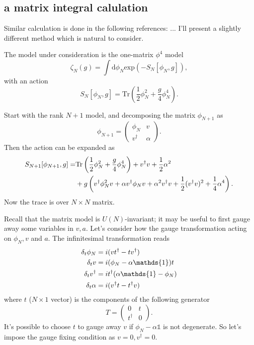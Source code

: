 \subsection{a matrix integral calulation}
Similar calculation is done in the following references: ...
I'll present a slightly different method which is natural to consider.


The model under consideration is the one-matrix $\phi^4$ model
\begin{equation}
    \zeta_N(g) = \int \mathrm{d}\phi_N \mathrm{exp}(-S_N[\phi_N,g]),
\end{equation}
with an action
\begin{equation}
    S_N[\phi_N,g] = \mathrm{Tr} (\frac{1}{2}\phi_N^2 + \frac{g}{4}\phi_N^4).
\end{equation}

Start with the rank $N+1$ model, and decomposing the matrix $\phi_{N+1}$ as
\begin{equation}
    \phi_{N+1} = \begin{pmatrix}
\phi_N & v\\ 
 v^\dagger & \alpha
\end{pmatrix}.
\end{equation}
Then the action can be expanded as
\begin{align}
	S_{N+1}[\phi_{N+1},g] = &\mathrm{Tr}\left( \frac{1}{2}\phi_N^2+\frac{g}{4}\phi_N^4\right) + v^\dagger v + \frac{1}{2}\alpha^2 \notag \\
	&+ g\left( v^\dagger \phi_N^2 v + \alpha v^\dagger \phi_N v + \alpha^2v^\dagger v + \frac{1}{2}(v^\dagger v)^2 + \frac{1}{4}\alpha^4\right ).
\end{align}
Now the trace is over $N\times N$ matrix.

Recall that the matrix model is $U(N)$-invariant;
it may be useful to first gauge away some variables in $v,a$.
Let's consider how the gauge transformation acting on $\phi_N, v$ and $a$.
The infinitesimal transformation reads
\begin{align}
    \delta_t\phi_N &= i (vt^\dagger - tv^\dagger) \notag\\
	\delta_t v &= i(\phi_N - \alpha\mathds{1})t\notag\\
\delta_t v^\dagger &= it^\dagger (\alpha\mathds{1}-\phi_N) \notag\\
\delta_t \alpha &= i(v^\dagger t - t^\dagger v)
\end{align}
where $t$ ($N\times 1$ vector) is the components of the following generator
\[
 T = \begin{pmatrix}
	 0 & t \\
	 t^\dagger & 0
 \end{pmatrix}
.\] 
It's possible to choose $t$ to gauge away $v$ if $\phi_N - \alpha \mathds{1}$ is not degenerate.
So let's impose the gauge fixing condition as $v=0,v^\dagger=0$.

